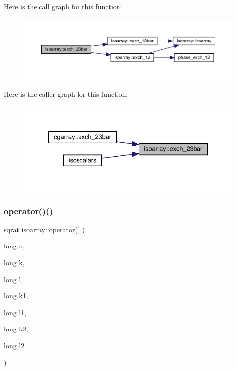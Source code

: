 Here is the call graph for this function\+:
\nopagebreak
\begin{figure}[H]
\begin{center}
\leavevmode
\includegraphics[width=350pt]{d5/dd9/classisoarray_ac6b8d6c435627c589a5bfa9edfa7408d_cgraph}
\end{center}
\end{figure}
Here is the caller graph for this function\+:
\nopagebreak
\begin{figure}[H]
\begin{center}
\leavevmode
\includegraphics[width=333pt]{d5/dd9/classisoarray_ac6b8d6c435627c589a5bfa9edfa7408d_icgraph}
\end{center}
\end{figure}
\mbox{\label{classisoarray_a07114d3b1b8f125d169f10f81884ce16}} 
\subsubsection{\texorpdfstring{operator()()}{operator()()}\hspace{0.1cm}{\footnotesize\ttfamily [1/3]}}
{\footnotesize\ttfamily \mbox{\hyperlink{classsqrat}{sqrat}} isoarray\+::operator() (\begin{DoxyParamCaption}\item[{long}]{n,  }\item[{long}]{k,  }\item[{long}]{l,  }\item[{long}]{k1,  }\item[{long}]{l1,  }\item[{long}]{k2,  }\item[{long}]{l2 }\end{DoxyParamCaption})}

